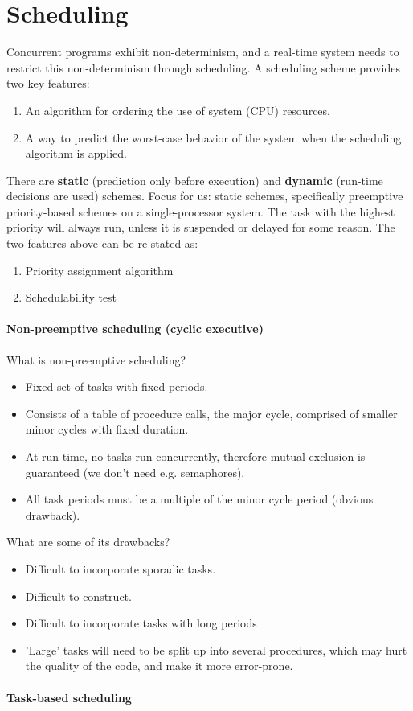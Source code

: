 \part{Scheduling}
Concurrent programs exhibit non-determinism, and a real-time system needs to restrict this non-determinism through scheduling. A scheduling scheme provides two key features:
\begin{enumerate}
    \item An algorithm for ordering the use of system (CPU) resources.
    \item A way to predict the worst-case behavior of the system when the scheduling algorithm is applied.
\end{enumerate}  
There are \textbf{static} (prediction only before execution) and \textbf{dynamic} (run-time decisions are used) schemes. Focus for us: static schemes, specifically preemptive priority-based schemes on a single-processor system. The task with the highest priority will always run, unless it is suspended or delayed for some reason. The two features above can be re-stated as:
\begin{enumerate}
    \item Priority assignment algorithm
    \item Schedulability test
\end{enumerate}

\subsection{Non-preemptive scheduling (cyclic executive)}
What is non-preemptive scheduling?
\begin{itemize}
    \item Fixed set of tasks with fixed periods.
    \item Consists of a table of procedure calls, the major cycle, comprised of smaller minor cycles with fixed duration.
    \item At run-time, no tasks run concurrently, therefore mutual exclusion is guaranteed (we don't need e.g. semaphores).
    \item All task periods must be a multiple of the minor cycle period (obvious drawback).
\end{itemize}
What are some of its drawbacks?
\begin{itemize}
    \item Difficult to incorporate sporadic tasks.
    \item Difficult to construct.
    \item Difficult to incorporate tasks with long periods
    \item 'Large' tasks will need to be split up into several procedures, which may hurt the quality of the code, and make it more error-prone.
\end{itemize}

\subsection{Task-based scheduling}
